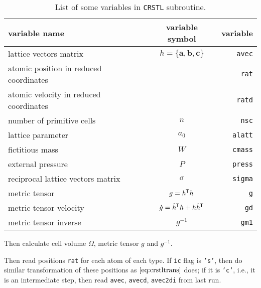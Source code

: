 \begin{table}[h]
	\centering
	\caption{List of some variables in \texttt{CRSTL} subroutine.}
	\begin{tabular}{@{}lcr@{}}
		\toprule
		{variable name}                        & variable symbol                                 & variable       \\
		\midrule
		lattice vectors matrix                 & $h = \{ \bm{a}, \bm{b}, \bm{c} \}$              & \texttt{avec}  \\
		atomic position in reduced coordinates &                                                 & \texttt{rat}   \\
		atomic velocity in reduced coordinates &                                                 & \texttt{ratd}  \\
		number of primitive cells              & $n$                                             & \texttt{nsc}   \\
		lattice parameter                      & $a_0$                                           & \texttt{alatt} \\
		fictitious mass                        & $W$                                             & \texttt{cmass} \\
		external pressure                      & $P$                                             & \texttt{press} \\
		reciprocal lattice vectors matrix      & $\sigma$                                        & \texttt{sigma} \\
		metric tensor                          & $g = h ^{\mkern-1.5mu\mathsf{T}} h$                                 & \texttt{g}     \\
		metric tensor velocity                 & $\dot{g} = \dot{ h }^{\mkern-1.5mu\mathsf{T}} h + h \dot{ h }^{\mkern-1.5mu\mathsf{T}}$ & \texttt{gd}    \\
		metric tensor inverse                  & $g^{-1}$                                        & \texttt{gm1}   \\
		\bottomrule
	\end{tabular}%
	\label{tab:crstl}%
\end{table}%

Then calculate cell volume $\Omega$, metric tensor $g$ and $g^{-1}$.

Then read positions \texttt{rat} for each atom of each type.
If \texttt{ic} flag is \texttt{'s'},
then do similar transformation of these positions as $\eqref{eq:crstltrans}$ does;
if it is \texttt{'c'}, i.e., it is an intermediate step, then read 
\texttt{avec}, \texttt{avecd}, \texttt{avec2di} from last run.


